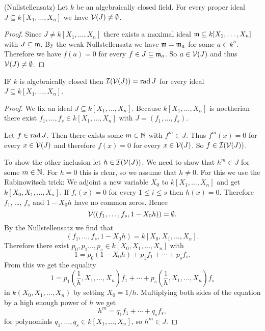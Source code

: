 \begin{cor}(Nullstellensatz)
  Let $k$ be an algebraically closed field. For every proper ideal $J \subseteq k[X_1, \dotsc, X_n]$ we have $\mathcal{V}(J) \neq \emptyset$.
\end{cor}
\begin{proof}
  Since $J \neq k[X_1, \dotsc, X_n]$ there exists a maximal ideal $\mathfrak{m} \subseteq k[X_1, \dotsc, X_n]$ with $J \subseteq \mathfrak{m}$. By the weak Nullstellensatz we have $\mathfrak{m} = \mathfrak{m}_a$ for some $a \in k^n$. Therefore we have $f(a) = 0$ for every $f \in J \subseteq \mathfrak{m}_a$. So $a \in \mathcal{V}(J)$ and thus $\mathcal{V}(J) \neq \emptyset$.
\end{proof}


\begin{cor}
  IF $k$ is algebraically closed then $\mathcal{I}(\mathcal{V}(J)) = \operatorname{rad} J$ for every ideal $J \subseteq k[X_1, \dotsc, X_n]$.
\end{cor}
\begin{proof}
  We fix an ideal $J \subseteq k[X_1, \dotsc, X_n]$. Because $k[X_1, \dotsc, X_n]$ is noetherian there exist $f_1, \dotsc, f_s \in k[X_1, \dotsc, X_n]$ with $J = (f_1, \dotsc, f_s)$.
  
  Let $f \in \operatorname{rad} J$. Then there exists some $m \in \mathbb{N}$ with $f^m \in J$. Thus $f^m(x) = 0$ for every $x \in \mathcal{V}(J)$ and therefore $f(x) = 0$ for every $x \in \mathcal{V}(J)$. So $f \in \mathcal{I}(\mathcal{V}(J))$.
  
  To show the other inclusion let $h \in \mathcal{I}(\mathcal{V}(J))$. We need to show that $h^m \in J$ for some $m \in \mathbb{N}$. For $h = 0$ this is clear, so we assume that $h \neq 0$. For this we use the Rabinowitsch trick: We adjoint a new variable $X_0$ to $k[X_1, \dotsc, X_n]$ and get $k[X_0, X_1, \dotsc, X_n]$. If $f_i(x) = 0$ for every $1 \leq i \leq s$ then $h(x) = 0$. Therefore $f_1$, \dots, $f_s$ and $1 - X_0 h$ have no common zeros. Hence
  \[
    \mathcal{V}((f_1, \dotsc, f_s, 1 - X_0 h)) = \emptyset.
  \]
  By the Nullstellensatz we find that
  \[
    (f_1, \dotsc, f_s, 1 - X_0 h) = k[X_0, X_1, \dotsc, X_n].
  \]
  Therefore there exist $p_0, p_1 \ldots, p_s \in k[X_0, X_1, \dotsc, X_n]$ with
  \[
    1 = p_0 (1 - X_0 h) + p_1 f_1 + \dotsb + p_s f_s.
  \]
  From this we get the equality
  \[
    1 = p_1\left(\frac{1}{h}, X_1, \dotsc, X_n\right) f_1 + \dotsb + p_s\left(\frac{1}{h}, X_1, \dotsc, X_n\right) f_s
  \]
  in $k(X_0, X_1, \dotsc, X_n)$ by setting $X_0 = 1/h$. Multiplying both sides of the equation by a high enough power of $h$ we get
  \[
    h^m = q_1 f_1 + \dotsb + q_s f_s,
  \]
  for polynomials $q_1, \dotsc, q_s \in k[X_1, \dotsc, X_n]$, so $h^m \in J$.
\end{proof}



